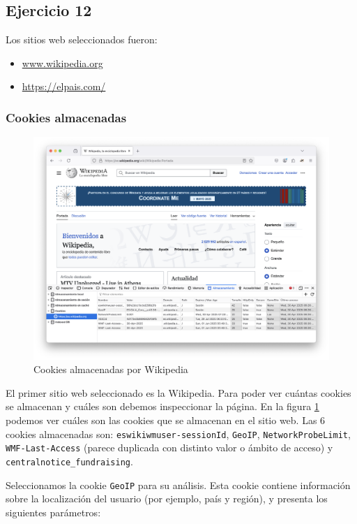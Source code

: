 \subsection{Ejercicio 12}
\graphicspath{ {img/12} }

Los sitios web seleccionados fueron:
\begin{itemize}
    \item \url{www.wikipedia.org}
    \item \url{https://elpais.com/}
\end{itemize}

\subsubsection{Cookies almacenadas}

\begin{figure}[H]
    \centering
    \includegraphics[width=\textwidth]{cookies_wiki.png}
    \caption{Cookies almacenadas por Wikipedia}
    \label{fig:cookies_wiki}
\end{figure}

El primer sitio web seleccionado es la Wikipedia. Para poder ver cuántas cookies se almacenan y cuáles son debemos inspeccionar la página. En la figura \ref{fig:cookies_wiki} podemos ver cuáles son las cookies que se almacenan en el sitio web. Las 6 cookies almacenadas son: \texttt{eswikiwmuser-sessionId}, \texttt{GeoIP}, \texttt{NetworkProbeLimit}, \texttt{WMF-Last-Access} (parece duplicada con distinto valor o ámbito de acceso) y \texttt{centralnotice\_fundraising}.

Seleccionamos la cookie \texttt{GeoIP} para su análisis. Esta cookie contiene información sobre la localización del usuario (por ejemplo, país y región), y presenta los siguientes parámetros:

